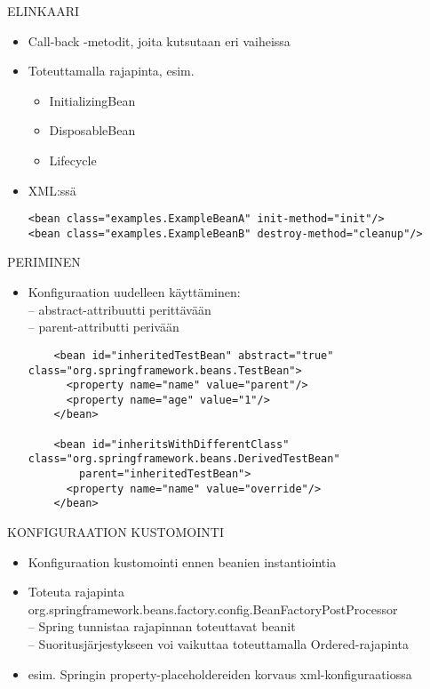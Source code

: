 \documentclass[hyperref={pdfauthor=\AUTHOR},14pt]{beamer}
\begin{document}
\begin{frame}[t, fragile]{ELINKAARI}
\begin{itemize}

 \item Call-back -metodit, joita kutsutaan eri vaiheissa
 \item Toteuttamalla rajapinta, esim.
\begin{itemize}
\item InitializingBean
\item DisposableBean
\item Lifecycle
\end{itemize}
 \item XML:ssä
\begin{lstlisting}
<bean class="examples.ExampleBeanA" init-method="init"/>
<bean class="examples.ExampleBeanB" destroy-method="cleanup"/>
\end{lstlisting}
\end{itemize}
\end{frame}
\begin{frame}[t, fragile]{PERIMINEN}
\begin{itemize}
 \item Konfiguraation uudelleen käyttäminen:\\
 -- abstract-attribuutti perittävään\\
 -- parent-attributti perivään   \\
\begin{lstlisting}
    <bean id="inheritedTestBean" abstract="true" class="org.springframework.beans.TestBean">
      <property name="name" value="parent"/>
      <property name="age" value="1"/>
    </bean>

    <bean id="inheritsWithDifferentClass" class="org.springframework.beans.DerivedTestBean"
        parent="inheritedTestBean">
      <property name="name" value="override"/>
    </bean>
\end{lstlisting}
\end{itemize}
\end{frame}
\begin{frame}[t, fragile]{KONFIGURAATION KUSTOMOINTI}
\begin{itemize}
 \item Konfiguraation kustomointi ennen beanien instantiointia
 \item Toteuta rajapinta org.springframework.beans.factory.config.BeanFactoryPostProcessor\\
 -- Spring tunnistaa rajapinnan toteuttavat beanit\\
 -- Suoritusjärjestykseen voi vaikuttaa toteuttamalla Ordered-rajapinta \\
 \item esim. Springin property-placeholdereiden korvaus xml-konfiguraatiossa 
\end{itemize}
\end{frame}
\end{document}
